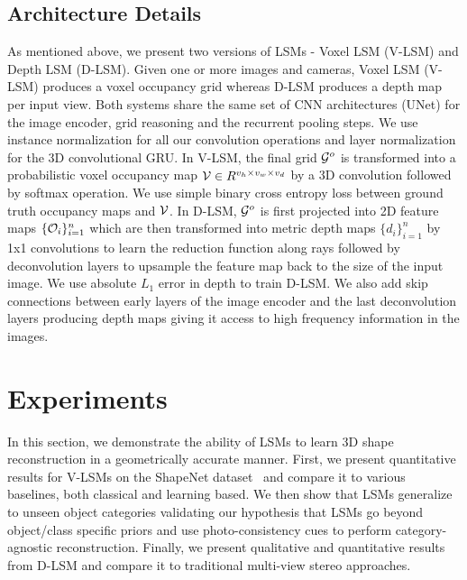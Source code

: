 \documentclass[../thesis.tex]{subfiles}
\begin{document}
\subsection{Architecture Details}
As mentioned above, we present two versions of LSMs - Voxel LSM (V-LSM) and Depth LSM (D-LSM). Given one or more images and cameras, Voxel LSM (V-LSM) produces a voxel occupancy grid whereas D-LSM produces a depth map per input view. Both systems share the same set of CNN architectures (UNet) for the image encoder, grid reasoning and the recurrent pooling steps. We use instance normalization for all our convolution operations and layer normalization for the 3D convolutional GRU. In V-LSM, the final grid $\mathcal{G}^o$ is transformed into a probabilistic voxel occupancy map $\mathcal{V} \in R^{v_h \times v_w \times v_d}$ by a 3D convolution followed by softmax operation. We use simple binary cross entropy loss between ground truth occupancy maps and $\mathcal{V}$. In D-LSM, $\mathcal{G}^o$ is first projected into 2D feature maps $\{\mathcal{O}_i\}_{i=1}^{n}$ which are then transformed into metric depth maps $\{d_i\}_{i=1}^{n}$ by 1x1 convolutions to learn the reduction function along rays followed by deconvolution layers to upsample the feature map back to the size of the input image. We use absolute $L_1$ error in depth to train D-LSM. We also add skip connections between early layers of the image encoder and the last deconvolution layers producing depth maps giving it access to high frequency information in the images.



\section{Experiments}
In this section, we demonstrate the ability of LSMs to learn 3D shape reconstruction in a geometrically accurate manner. First, we present quantitative results for V-LSMs on the ShapeNet dataset~\cite{shapenet2015} and compare it to various baselines, both classical and learning based. We then show that LSMs generalize to unseen object categories validating our hypothesis that LSMs go beyond object/class specific priors and use photo-consistency cues to perform category-agnostic reconstruction. Finally, we present qualitative and quantitative results from D-LSM and compare it to traditional multi-view stereo approaches.
\end{document}
